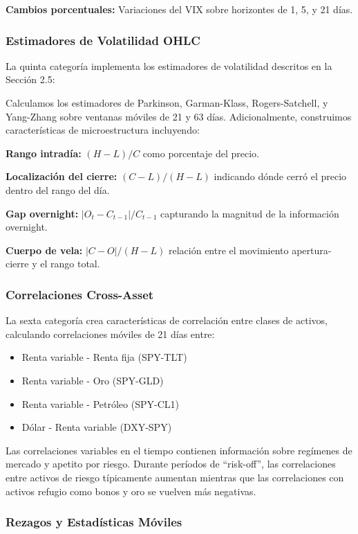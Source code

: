 \documentclass[11pt,a4paper]{article}
\begin{document}
\textbf{Cambios porcentuales:} Variaciones del VIX sobre horizontes de 1, 5, y 21 días.

\subsubsection{Estimadores de Volatilidad OHLC}

La quinta categoría implementa los estimadores de volatilidad descritos en la Sección 2.5:

Calculamos los estimadores de Parkinson, Garman-Klass, Rogers-Satchell, y Yang-Zhang sobre ventanas móviles de 21 y 63 días. Adicionalmente, construimos características de microestructura incluyendo:

\textbf{Rango intradía:} $(H - L) / C$ como porcentaje del precio.

\textbf{Localización del cierre:} $(C - L) / (H - L)$ indicando dónde cerró el precio dentro del rango del día.

\textbf{Gap overnight:} $|O_t - C_{t-1}| / C_{t-1}$ capturando la magnitud de la información overnight.

\textbf{Cuerpo de vela:} $|C - O| / (H - L)$ relación entre el movimiento apertura-cierre y el rango total.

\subsubsection{Correlaciones Cross-Asset}

La sexta categoría crea características de correlación entre clases de activos, calculando correlaciones móviles de 21 días entre:

\begin{itemize}[noitemsep]
    \item Renta variable - Renta fija (SPY-TLT)
    \item Renta variable - Oro (SPY-GLD)
    \item Renta variable - Petróleo (SPY-CL1)
    \item Dólar - Renta variable (DXY-SPY)
\end{itemize}

Las correlaciones variables en el tiempo contienen información sobre regímenes de mercado y apetito por riesgo. Durante períodos de ``risk-off'', las correlaciones entre activos de riesgo típicamente aumentan mientras que las correlaciones con activos refugio como bonos y oro se vuelven más negativas.

\subsubsection{Rezagos y Estadísticas Móviles}
\end{document}

